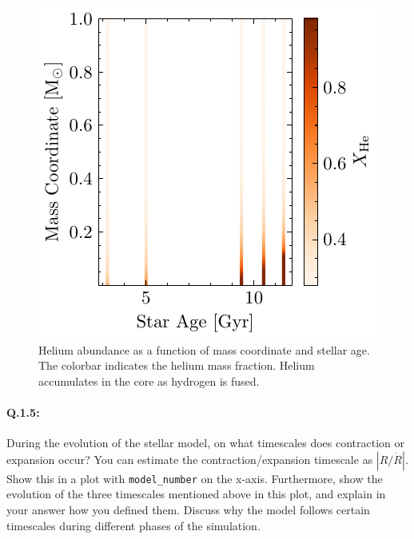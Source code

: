 \documentclass[twocolumn,fontsize=11pt]{scrartcl}
\begin{document}
\begin{figure}[htbp]
    \centering
    \includegraphics{q14_abundancy_He.pdf}
    \caption{Helium abundance as a function of mass coordinate and stellar age. The colorbar indicates the helium mass fraction. Helium accumulates in the core as hydrogen is fused.}
    \label{fig:q14_abundancy_e}
\end{figure}
\paragraph{Q.1.5:} During the evolution of the stellar model, on what timescales does contraction or expansion occur? You can estimate the contraction/expansion timescale as \(\left|R/\dot{R}\right|\). Show this in a plot with \texttt{model\_number} on the x-axis. Furthermore, show the evolution of the three timescales mentioned above in this plot, and explain in your answer how you defined them. Discuss why the model follows certain timescales during different phases of the simulation.
\end{document}
